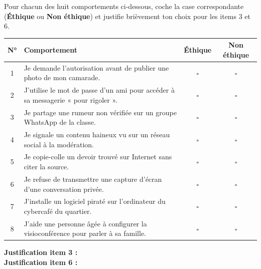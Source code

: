 \documentclass[11pt]{article}
\begin{document}
\begin{exercice}
Pour chacun des huit comportements ci-dessous, coche la case correspondante (\textbf{Éthique} ou \textbf{Non éthique}) et justifie brièvement ton choix pour les items 3 et 6.

\begin{center}
\begin{tabularx}{\linewidth}{|c|X|c|c|}\hline
\rowcolor{popblueL}\textbf{N°} & \textbf{Comportement} & \textbf{Éthique} & \textbf{Non éthique} \\\hline
1 & Je demande l'autorisation avant de publier une photo de mon camarade. & $\square$ & $\square$ \\\hline
2 & J'utilise le mot de passe d'un ami pour accéder à sa messagerie « pour rigoler ». & $\square$ & $\square$ \\\hline
3 & Je partage une rumeur non vérifiée sur un groupe WhatsApp de la classe. & $\square$ & $\square$ \\\hline
4 & Je signale un contenu haineux vu sur un réseau social à la modération. & $\square$ & $\square$ \\\hline
5 & Je copie-colle un devoir trouvé sur Internet sans citer la source. & $\square$ & $\square$ \\\hline
6 & Je refuse de transmettre une capture d'écran d'une conversation privée. & $\square$ & $\square$ \\\hline
7 & J'installe un logiciel piraté sur l'ordinateur du cybercafé du quartier. & $\square$ & $\square$ \\\hline
8 & J'aide une personne âgée à configurer la visioconférence pour parler à sa famille. & $\square$ & $\square$ \\\hline
\end{tabularx}
\end{center}

\textbf{Justification item 3 :} \dotfill \\[1cm]
\textbf{Justification item 6 :} \dotfill
\end{exercice}
\end{document}
